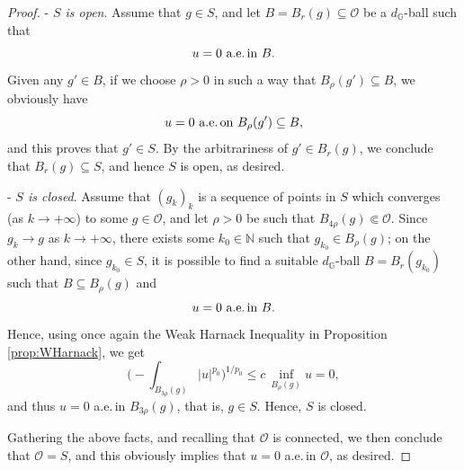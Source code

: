 \documentclass[10pt,a4paper]{amsart}
\begin{document}
\begin{proof}
 
 -\,\,\emph{$S$ is open}. Assume that $g\in S$, and let $B = B_r(g)\subseteq \mathcal{O}$ be a 
 $d_\mathbb{G}$-ball such that  
 $$\text{$u = 0$ a.e.\,in $B$}.$$ 
 Given any $g'\in B$, if we choose $\rho > 0$ in such a way that $B_\rho(g')\subseteq B$, we obviously have
  $$\text{$u = 0$ a.e.\,on $B_{\rho}(g')\subseteq B$},$$
 and this proves that $g'\in S$.
 By the arbitrariness of $g'\in B_r(g)$, we  conclude that $B_r(g)\subseteq S$, and hence $S$ is open, as desired.

 \medskip

-\,\,\emph{$S$ is closed}. Assume that $(g_k)_k$ is a sequence of points in $S$ which converges (as $k\to+\infty$) to some $g\in\mathcal{O}$, and let $\rho > 0$
be such that $B_{4\rho}(g)\Subset\mathcal{O}$. Since $g_k\to g$ as $k\to+\infty$, there
exists some $k_0\in\mathbb{N}$ such that $g_{k_0}\in B_\rho(g)$; on the other hand, since
$g_{k_0}\in S$, it is possible to find a suitable $d_\mathbb{G}$-ball $B = B_r(g_{k_0})$
such that $B \subseteq B_\rho(g)$ and
$$\text{$u = 0$ a.e.\,in $B$}.$$
Hence, using once again the 
Weak
 Harnack Inequality in Proposition \ref{prop:WHarnack}, we get
$$\Big(-\!\!\!\!\!\!\!\int_{B_{3\rho}(g)}|u|^{p_0}\Big)^{1/p_0}\leq c\,\inf_{B_{\rho}(g)}u = 0,
$$
and thus $u = 0$ a.e.\,in $B_{3\rho}(g)$, that is, $g\in S$. Hence, $S$ is closed.
\medskip

Gathering the above facts, and recalling that $\mathcal{O}$ is connected, we then conclude that $\mathcal{O} = S$, and this obviously implies that
$u = 0$ a.e.\,in $\mathcal{O}$, as desired.
\end{proof}
\end{document}
